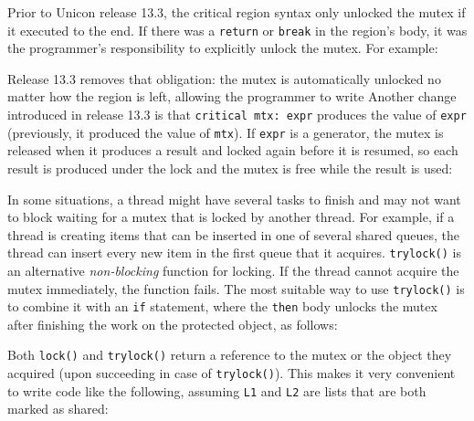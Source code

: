 Prior to Unicon release 13.3,
the critical region syntax only unlocked the mutex if it executed to the end. If
there was a \texttt{return} or \texttt{break} in the region's body, it was the
programmer's responsibility to explicitly unlock the mutex.  For example:

\noindent
Release 13.3 removes that obligation: the mutex is automatically unlocked no
matter how the region is left, allowing the programmer to write
\noindent
Another change introduced in release 13.3 is that \texttt{critical mtx: expr}
produces the value of \texttt{expr} (previously, it produced the value of
\texttt{mtx}). If \texttt{expr} is a generator, the mutex is released when
it produces a result and locked again before it is resumed, so each result is
produced under the lock and the mutex is free while the result is used:


\bigskip
In some situations, a thread might have several tasks to finish and may not want
to block waiting for a mutex that is locked by another thread. For example, if a
thread is creating items that can be inserted in one of several shared queues,
the thread can insert every new item in the first queue that it
acquires. \texttt{trylock()} is an alternative \emph{non-blocking} function for
locking. If the thread cannot acquire the mutex immediately, the function
fails. The most suitable way to use \texttt{trylock()} is to combine it with an
\texttt{if} statement, where the \texttt{then} body unlocks the mutex after
finishing the work on the protected object, as follows:


Both \texttt{lock()} and \texttt{trylock()} return a reference to the mutex or
the object they acquired (upon succeeding in case of \texttt{trylock()}). This
makes it very convenient to write code like the following, assuming \texttt{L1}
and \texttt{L2} are lists that are both marked as shared:


